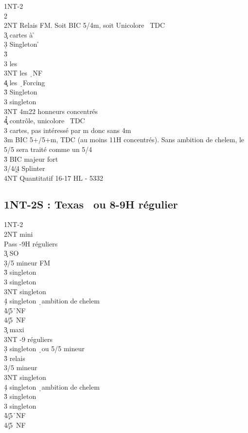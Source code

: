 \documentclass[a4paper]{article}
\begin{document}
\begin{bidtable}
1NT-2\h\\
2\s\+\\
2NT \> Relais FM. Soit BIC 5\s /4m, soit Unicolore \s\ TDC\+\\
3\c {} cartes à \h \+\\
3\d \> Singleton \h \+\\
3\h\+\\
3\s \> les \c \\
3NT \> les \d\ NF\\
4\c \> les \d\ Forcing\-\-\\
3\h \> Singleton \c \\
3\s \> singleton \d \\
3NT \s 4m22 honneurs concentrés\\
4\c\d\h \> contrôle, unicolore \s\ TDC\-\\
3\s {} cartes, pas intéressé par m donc sans 4m\-\\
3m \> BIC 5+\s /5+m, TDC (au moins 11H concentrés). Sans ambition de chelem, le 5/5 sera traité comme un 5/4\\
3\h \> BIC majeur fort\\
3\s/4\c/4\d \> Splinter\\
4NT \> Quantitatif 16-17 HL - 5332\-
\end{bidtable}

\subsection{1NT-2S : Texas \pdfc\ ou 8-9H régulier}

\begin{bidtable}
1NT-2\s\\
2NT \> mini\+\\
Pass -9H réguliers\\
3\c \> SO\\
3\d {}/5 mineur FM\\
3\h \> singleton \s \\
3\s \> singleton \h \\
3NT \> singleton \d \\
4\d \> singleton \d\ ambition de chelem\\
4\h {}\c /5\h\ NF\\
4\s {}\c /5\s\ NF\-\\
3\c \> maxi\+\\
3NT -9 réguliers\\
3\d \> singleton \d\ ou 5/5 mineur\+\\
3\h \> relais\+\\
3\s {}/5 mineur\\
3NT \> singleton \d \\
4\d \> singleton \d\ ambition de chelem\-\-\\
3\h \> singleton \s \\
3\s \> singleton \h \\
4\h {}\c /5\h\ NF\\
4\s {}\c /5\s\ NF\-
\end{bidtable}
\end{document}

